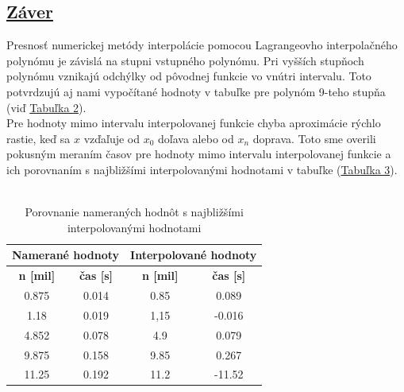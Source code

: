\documentclass[12pt]{article}
\begin{document}
\begin{listing}[language=C++, caption=Funkcia Heapify]
\section{\underline{Záver}}
    \normalsize
Presnosť numerickej metódy interpolácie pomocou Lagrangeovho interpolačného polynómu je závislá na stupni vstupného polynómu. Pri vyšších stupňoch polynómu vznikajú odchýlky od pôvodnej funkcie vo vnútri intervalu. Toto potvrdzujú aj nami vypočítané hodnoty v tabuľke pre polynóm 9-teho stupňa (viď \hyperlink{tab-lagrange}{Tabuľka 2}).\\
Pre hodnoty mimo intervalu interpolovanej funkcie chyba aproximácie rýchlo rastie, keď sa $x$ vzďaľuje od $x_0$ doľava alebo od $x_n$ doprava. Toto sme overili pokusným meraním časov pre hodnoty mimo intervalu interpolovanej funkcie a ich porovnaním s najbližšími interpolovanými hodnotami v tabuľke (\hyperlink{tab-porovnanie}{Tabuľka 3}). \\ \\
\newpage
\hypertarget{tab-porovnanie}{}   
\begin{table}[!h]
\renewcommand{\arraystretch}{1.3} 
\centering
\caption{Porovnanie nameraných hodnôt s najbližšími interpolovanými hodnotami}
\begin{tabular}{|cc||cc|}
\hline
\multicolumn{2}{|c||}{\textbf{Namerané hodnoty}}                   & \multicolumn{2}{c|}{\textbf{Interpolované hodnoty}}              \\ \hline
\multicolumn{1}{|c|}{\textbf{n {[}mil{]}}} & \textbf{čas {[}s{]}} & \multicolumn{1}{c|}{\textbf{n {[}mil{]}}} & \textbf{čas {[}s{]}} \\ \hline
\multicolumn{1}{|c|}{0.875}                & 0.014                & \multicolumn{1}{c|}{0.85}                 & 0.089                \\ \hline
\multicolumn{1}{|c|}{1.18}                & 0.019                & \multicolumn{1}{c|}{1,15}                    & -0.016                \\ \hline
\multicolumn{1}{|c|}{4.852}                & 0.078                & \multicolumn{1}{c|}{4.9}                  & 0.079                \\ \hline
\multicolumn{1}{|c|}{9.875}                & 0.158                & \multicolumn{1}{c|}{9.85}                 & 0.267                \\ \hline
\multicolumn{1}{|c|}{11.25}                & 0.192                & \multicolumn{1}{c|}{11.2}                 & -11.52               \\ \hline
\end{tabular}


\end{table}
\end{listing}
\end{document}
